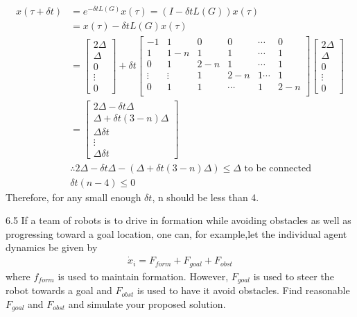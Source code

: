 \documentclass{article}
\begin{document}
\begin{problem}
    \begin{align*}
        x (\tau + \delta t) &= e^{-\delta t L(G)}  x(\tau) =(I - \delta t L(G))x(\tau)\\
        &=x(\tau) - \delta t L(G) x(\tau)\\
        &= \begin{bmatrix*}
            2 \Delta \\
            \Delta\\
            0\\
            \vdots\\
            0
        \end{bmatrix*} + 
        \delta t \begin{bmatrix*}
            -1 & 1 & 0 & 0 & \cdots &0 \\
             1 & 1-n & 1 & 1 & \cdots & 1\\
             0 & 1 & 2-n & 1 & \cdots & 1 \\
             \vdots & \vdots & 1&2-n &1 \cdots &1\\
             0& 1&1&\cdots &1&2-n\\
        \end{bmatrix*} 
        \begin{bmatrix*}
            2 \Delta \\
            \Delta\\
            0\\
            \vdots\\
            0
        \end{bmatrix*} \\
        &= \begin{bmatrix*}
            2\Delta - \delta t \Delta\\
            \Delta +  \delta t (3-n)\Delta\\
            \Delta \delta t\\
            \vdots\\
            \Delta \delta t
        \end{bmatrix*}\\
        &\therefore 2\Delta - \delta t \Delta -(\Delta +  \delta t (3-n)\Delta) \leq \Delta \text{ to be connected}\\
        &\delta t (n-4) \leq 0
    \end{align*} 
    Therefore, for any small enough $\delta t$, n should be less than 4. 
\end{problem}
\begin{problem}6.5
    If a team of robots is to drive in formation while avoiding obstacles as well as progressing toward a goal location, one can, for example,let the individual agent dynamics be given by
    \begin{align*}
        \dot x_i = F_{form} + F_{goal} + F_{obst}
    \end{align*}
    where $f_{form}$ is used to maintain formation. However, $F_{goal}$ is used to steer the robot towards a goal and $F_{obst}$ is used to have it avoid obstacles. Find reasonable $F_{goal}$ and $F_{obst}$ and simulate your proposed solution. 
    
\end{problem}
\end{document}
